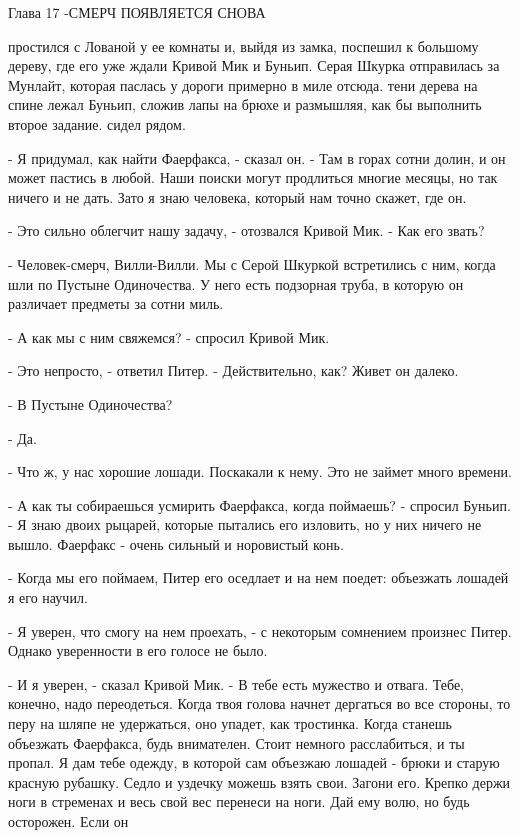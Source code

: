 Глава 17
-СМЕРЧ ПОЯВЛЯЕТСЯ СНОВА
\par{} простился с Лованой у ее комнаты и, выйдя из замка, поспешил 
к большому дереву, где его уже ждали Кривой Мик и Буньип. Серая Шкурка 
отправилась за Мунлайт, которая паслась у дороги примерно в миле 
отсюда.
 тени дерева на спине лежал Буньип, сложив лапы на брюхе и 
размышляя, как бы выполнить второе задание.
 сидел рядом.
\par- Я придумал, как найти Фаерфакса, - сказал он. - Там в горах 
сотни долин, и он может пастись в любой. Наши поиски могут продлиться 
многие месяцы, но так ничего и не дать. Зато я знаю человека, который 
нам точно скажет, где он.
\par- Это сильно облегчит нашу задачу, - отозвался Кривой Мик. - Как 
его звать?
\par- Человек-смерч, Вилли-Вилли. Мы с Серой Шкуркой встретились с 
ним, когда шли по Пустыне Одиночества. У него есть подзорная труба, в 
которую он различает предметы за сотни миль.
\par- А как мы с ним свяжемся? - спросил Кривой Мик.
\par- Это непросто, - ответил Питер. - Действительно, как? Живет он 
далеко.
\par- В Пустыне Одиночества?
\par- Да.
\par- Что ж, у нас хорошие лошади. Поскакали к нему. Это не займет 
много времени.
\par- А как ты собираешься усмирить Фаерфакса, когда поймаешь? - 
спросил Буньип. - Я знаю двоих рыцарей, которые пытались его изловить, 
но у них ничего не вышло. Фаерфакс - очень сильный и норовистый конь.
\par- Когда мы его поймаем, Питер его оседлает и на нем поедет: 
объезжать лошадей я его научил.
\par- Я уверен, что смогу на нем проехать, - с некоторым сомнением 
произнес Питер. Однако уверенности в его голосе не было.
\par- И я уверен, - сказал Кривой Мик. - В тебе есть мужество и 
отвага. Тебе, конечно, надо переодеться. Когда твоя голова начнет 
дергаться во все стороны, то перу на шляпе не удержаться, оно упадет, 
как тростинка. Когда станешь объезжать Фаерфакса, будь внимателен. 
Стоит немного расслабиться, и ты пропал. Я дам тебе одежду, в которой 
сам объезжаю лошадей - брюки и старую красную рубашку. Седло и уздечку 
можешь взять свои. Загони его. Крепко держи ноги в стременах и весь 
свой вес перенеси на ноги. Дай ему волю, но будь осторожен. Если он 
